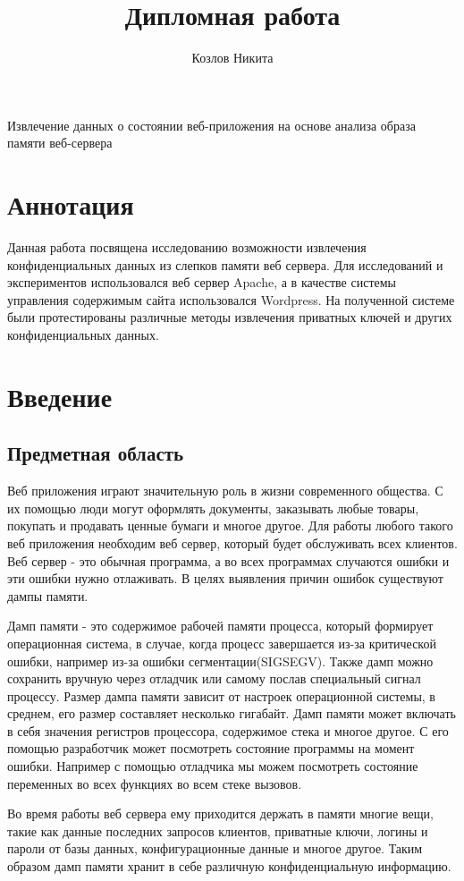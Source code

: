 \documentclass[20pt]{article}
\title{Дипломная работа}
\author{Козлов Никита}
\begin{document}
{\huge Извлечение данных о состоянии веб-приложения на основе анализа образа памяти веб-сервера}

\newpage

\section*{Аннотация}
Данная работа посвящена исследованию возможности извлечения конфиденциальных
данных из слепков памяти веб сервера. Для исследований и экспериментов
использовался веб сервер Apache, а в качестве системы управления содержимым
сайта использовался Wordpress. На полученной системе были протестированы
различные методы извлечения приватных ключей и других конфиденциальных данных.

\newpage

\tableofcontents

\newpage

\section{Введение}

\subsection{Предметная область}
Веб приложения играют значительную роль в жизни современного общества. С их помощью
люди могут оформлять документы, заказывать любые товары, покупать и продавать ценные
бумаги и многое другое. Для работы любого такого веб приложения необходим веб сервер,
который будет обслуживать всех клиентов. Веб сервер - это обычная программа, а во
всех программах случаются ошибки и эти ошибки нужно отлаживать. В целях выявления
причин ошибок существуют дампы памяти.

Дамп памяти - это содержимое рабочей памяти процесса, который формирует операционная
система, в случае, когда процесс завершается из-за критической ошибки, например
из-за ошибки сегментации(SIGSEGV). Также дамп можно сохранить вручную через отладчик
или самому послав специальный сигнал процессу. Размер дампа памяти зависит от настроек
операционной системы, в среднем, его размер составляет несколько гигабайт. Дамп
памяти может включать в себя значения регистров процессора, содержимое стека и
многое другое. С его помощью разработчик может посмотреть состояние программы
на момент ошибки. Например с помощью отладчика мы можем посмотреть состояние
переменных во всех функциях во всем стеке вызовов.

Во время работы веб сервера ему приходится держать в памяти многие вещи, такие
как данные последних запросов клиентов, приватные ключи, логины и пароли от базы
данных, конфигурационные данные и многое другое. Таким образом дамп памяти
хранит в себе различную конфиденциальную информацию.
\end{document}
